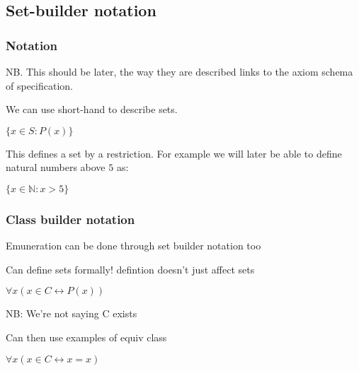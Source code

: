 
\subsection{Set-builder notation}

\subsubsection{Notation}

NB. This should be later, the way they are described links to the axiom schema of specification.

We can use short-hand to describe sets.

\(\{x\in S: P(x)\}\)

This defines a set by a restriction. For example we will later be able to define natural numbers above \(5\) as:

\(\{x\in \mathbb{N} : x>5\}\)

\subsubsection{Class builder notation}

Emuneration can be done through set builder notation too

Can define sets formally! defintion doesn't just affect sets

\(\forall x (x\in C \leftrightarrow P(x))\)

NB: We're not saying C exists

Can then use examples of equiv class

\(\forall x (x\in C \leftrightarrow x=x)\)

